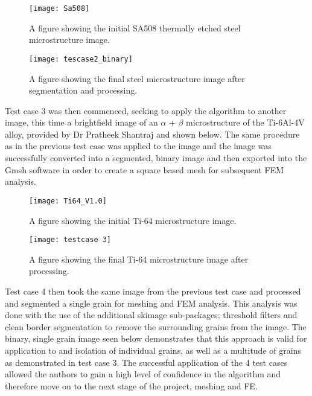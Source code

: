 \documentclass[\report.tex]{subfiles}
\begin{document}
\begin{figure}
  \centering
  \begin{minipage}[!htb]{.5\textwidth}
    \centering\captionsetup{width=.8\linewidth}%
    \texttt{[image: Sa508]}
    \caption{A figure showing the initial SA508 thermally etched steel microstructure image.}\label{fig:SA508}
  \end{minipage}%
  \begin{minipage}[!htb]{.5\textwidth}
    \centering\captionsetup{width=.8\linewidth}%
    \texttt{[image: tescase2\_binary]}
    \caption{A figure showing the final steel microstructure image after segmentation and processing.}\label{fig:SA508_2}
  \end{minipage}
\end{figure}

\noindent Test case 3 was then commenced, seeking to apply the algorithm to another image, this time a brightfield image of an $\alpha$ + $\beta$ microstructure of the Ti-6Al-4V alloy, provided by Dr Pratheek Shantraj and shown below. The same procedure as in the previous test case was applied to the image and the image was successfully converted into a segmented, binary image and then exported into the Gmsh software in order to create a square based mesh for subsequent FEM analysis.

\begin{figure}
\centering
\parbox{6cm}{
\texttt{[image: Ti64\_V1.0]}
\caption{A figure showing the initial Ti-64 microstructure image.}
\label{fig:2figsA}}
\qquad
\begin{minipage}{7cm}
\texttt{[image: testcase 3]}
\caption{A figure showing the final Ti-64 microstructure image after processing.}
\label{fig:2figsB}
\end{minipage}
\end{figure}

\noindent Test case 4 then took the same image from the previous test case and processed and segmented a single grain for meshing and FEM analysis. This analysis was done with the use of the additional skimage sub-packages; threshold filters and clean border segmentation to remove the surrounding grains from the image. The binary, single grain image seen below demonstrates that this approach is valid for application to and isolation of individual grains, as well as a multitude of grains as demonstrated in test case 3. The successful application of the 4 test cases allowed the authors to gain a high level of confidence in the algorithm and therefore move on to the next stage of the project, meshing and FE.\\
\end{document}

